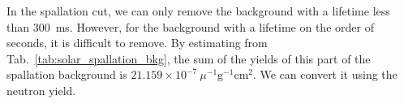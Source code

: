 In the spallation cut, we can only remove the background with a lifetime less than \SI{300}{ms}. However, for the background with a lifetime on the order of seconds, it is difficult to remove. By estimating from Tab.~\ref{tab:solar_spallation_bkg}, the sum of the yields of this part of the spallation background is $21.159\times 10^{-7}~\mu^{-1}\mathrm{g}^{-1}\mathrm{cm}^{2}$. We can convert it using the neutron yield.